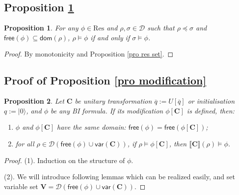\documentclass[conference,compsoc, 10pt]{IEEEtran}
\newtheorem{proposition}{Proposition}[section]
\newcommand {\qI} {{q:=|0\rangle}}
\newcommand {\qU} {{\overline{q}:=U[\overline{q}]}}
\newcommand {\cD } {{\mathcal{D}}}
\newcommand {\free }[1] {{\mathsf{free}\left(#1\right)}}
\newcommand {\res} {{\mathrm{Res}}}
\newcommand {\LTypeE }[1] {{\mathsf{dom}\!\left(#1\right)}}
\newcommand {\LTypeF }[1] {{\mathsf{free}{\left(#1\right)}}}
\newcommand {\vars } {\mathbf{V}}
\newcommand {\var } {\mathsf{var}}
\newcommand {\prog } {{\mathbf{C}}}
\newcommand {\sem}[1] {\llbracket#1\rrbracket}
\begin{document}
\begin{appendices}
		\subsection{Proposition \ref{pro BI res mon}}
		
		\begin{proposition}
			\label{pro BI res mon}
			For any $\phi\in\res$ and $\rho,\sigma\in \cD$ such that $\rho\preceq \sigma$ and $\LTypeF{\phi}\subseteq\LTypeE{\rho}$, 
			$\rho\models \phi$ if and only if $\sigma\models \phi$.
		\end{proposition}
		\begin{proof}
			By monotonicity and Proposition \ref{pro res set}.
		\end{proof}
		
		\subsection{Proof of Proposition \ref{pro modification}}
		
		\begin{proposition}
			Let $\prog$ be unitary transformation $\qU$ or initialisation $\qI$, and $\phi$ be any BI formula. If its modification  $\phi[\prog]$ is defined, then:
			\begin{enumerate}
				\item $\phi$ and $\phi[\prog]$ have the same domain: $\free{\phi} = \free{\phi[\prog]}$;
				\item for all $\rho\in\cD(\free{\phi}\cup\var(\prog))$, if $\rho\models \phi[\prog]$, then $\sem{\prog}(\rho)\models \phi$.
			\end{enumerate}
		\end{proposition}
		
		
		\begin{proof}
			
			\noindent (1). Induction on the structure of $\phi$.
			
			\vspace{0.2cm}
			
			\noindent (2). 	We will introduce following lemmas which can be realized easily, and set variable set $\vars = \cD(\free{\phi}\cup\var(\prog))$.	
			

\end{proof}
\end{appendices}
\end{document}
